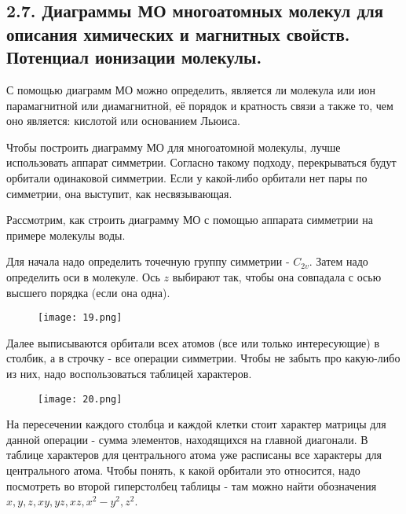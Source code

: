 
\subsection{2.7. Диаграммы МО многоатомных молекул для описания химических и магнитных свойств. Потенциал ионизации молекулы.} 

\par\bigskip
	
С помощью диаграмм МО можно определить, является ли
молекула или ион парамагнитной или диамагнитной, её порядок и
кратность связи а также то, чем оно является: кислотой или
основанием Льюиса.

\par\smallskip	


Чтобы построить диаграмму МО для многоатомной молекулы,
лучше использовать аппарат симметрии. Согласно такому подходу,
перекрываться будут орбитали одинаковой симметрии. Если у
какой-либо орбитали нет пары по симметрии, она выступит, как
несвязывающая.

\par\smallskip	


Рассмотрим, как строить диаграмму МО с помощью аппарата
симметрии на примере молекулы воды.

\par\smallskip	

Для начала надо определить точечную группу симметрии - $C_{2v}$.
Затем надо определить оси в молекуле. Ось $z$ выбирают так, чтобы
она совпадала с осью высшего порядка (если она одна).

\begin{figure}[H]
	\centering
	{\texttt{[image: 19.png]}}
\end{figure}	


Далее выписываются орбитали всех атомов (все или только
интересующие) в столбик, а в строчку - все операции симметрии.
Чтобы не забыть про какую-либо из них, надо воспользоваться
таблицей характеров. 

\begin{figure}[H]
	\centering
	{\texttt{[image: 20.png]}}
\end{figure}


На пересечении каждого столбца и каждой клетки стоит характер
матрицы для данной операции - сумма элементов, находящихся на
главной диагонали. В таблице характеров для центрального атома
уже расписаны все характеры для центрального атома. Чтобы
понять, к какой орбитали это относится, надо посмотреть во второй
гиперстолбец таблицы - там можно найти обозначения $x, y, z, xy,
yz, xz, x^2-y^2, z^2$.


